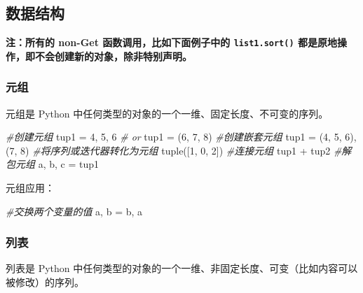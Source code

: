 \documentclass[utf-8]{ctexart}
\newenvironment{Shaded}{}{}
\newcommand{\DecValTok}[1]{\textcolor[rgb]{0.25,0.63,0.44}{#1}}
\newcommand{\CommentTok}[1]{\textcolor[rgb]{0.38,0.63,0.69}{\textit{#1}}}
\newcommand{\OperatorTok}[1]{\textcolor[rgb]{0.40,0.40,0.40}{#1}}
\newcommand{\BuiltInTok}[1]{#1}
\newcommand{\NormalTok}[1]{#1}
\begin{document}
\hypertarget{header-n128}{\subsection{数据结构}\label{header-n128}}

\textbf{注：所有的 non-Get 函数调用，比如下面例子中的
\texttt{list1.sort()} 都是原地操作，即不会创建新的对象，除非特别声明。}

\subsubsection{元组}\label{header-n131}

元组是 Python 中任何类型的对象的一个一维、固定长度、不可变的序列。

\begin{Shaded}
\begin{Highlighting}[]
\CommentTok{#创建元组}
\NormalTok{tup1 }\OperatorTok{=} \DecValTok{4}\NormalTok{, }\DecValTok{5}\NormalTok{, }\DecValTok{6} 
\CommentTok{# or}
\NormalTok{tup1 }\OperatorTok{=}\NormalTok{ (}\DecValTok{6}\NormalTok{, }\DecValTok{7}\NormalTok{, }\DecValTok{8}\NormalTok{)}
\CommentTok{#创建嵌套元组}
\NormalTok{tup1 }\OperatorTok{=}\NormalTok{ (}\DecValTok{4}\NormalTok{, }\DecValTok{5}\NormalTok{, }\DecValTok{6}\NormalTok{), (}\DecValTok{7}\NormalTok{, }\DecValTok{8}\NormalTok{)}
\CommentTok{#将序列或迭代器转化为元组}
\BuiltInTok{tuple}\NormalTok{([}\DecValTok{1}\NormalTok{, }\DecValTok{0}\NormalTok{, }\DecValTok{2}\NormalTok{])}
\CommentTok{#连接元组}
\NormalTok{tup1 }\OperatorTok{+}\NormalTok{ tup2}
\CommentTok{#解包元组}
\NormalTok{a, b, c }\OperatorTok{=}\NormalTok{ tup1}
\end{Highlighting}
\end{Shaded}

元组应用：

\begin{Shaded}
\begin{Highlighting}[]
\CommentTok{#交换两个变量的值}
\NormalTok{a, b }\OperatorTok{=}\NormalTok{ b, a}
\end{Highlighting}
\end{Shaded}

\subsubsection{列表}\label{header-n138}

列表是 Python
中任何类型的对象的一个一维、非固定长度、可变（比如内容可以被修改）的序列。
\end{document}
